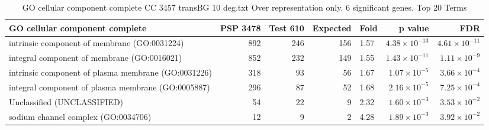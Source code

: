 \begin{table}[ht]
\centering
\begin{adjustbox}{width=\textwidth}
\begin{tabular}{lrrrlrr}
  \hline
GO cellular component complete & PSP 3478 & Test 610 & Expected & Fold & p value & FDR \\ 
  \hline
intrinsic component of membrane (GO:0031224) & 892 & 246 & 156 & 1.57 & $4.38 \times 10^{-13}$ & $4.61 \times 10^{-11}$ \\ 
  integral component of membrane (GO:0016021) & 852 & 232 & 149 & 1.55 & $1.43 \times 10^{-11}$ & $1.11 \times 10^{-9}$ \\ 
  intrinsic component of plasma membrane (GO:0031226) & 318 & 93 & 56 & 1.67 & $1.07 \times 10^{-5}$ & $3.66 \times 10^{-4}$ \\ 
  integral component of plasma membrane (GO:0005887) & 296 & 87 & 52 & 1.68 & $2.16 \times 10^{-5}$ & $7.25 \times 10^{-4}$ \\ 
  Unclassified (UNCLASSIFIED) & 54 & 22 & 9 & 2.32 & $1.60 \times 10^{-3}$ & $3.53 \times 10^{-2}$ \\ 
  sodium channel complex (GO:0034706) & 12 & 9 & 2 & 4.28 & $1.89 \times 10^{-3}$ & $3.92 \times 10^{-2}$ \\ 
   \hline
\end{tabular}
\end{adjustbox}
\caption{GO cellular component complete CC 3457 transBG 10 deg.txt Over representation only. 6 significant genes. Top 20 Terms} 
\label{tab:GO cellular component complete CC 3457 transBG 10 deg.txt Over representation only. 6 significant genes. Top 20 Terms}
\end{table}






